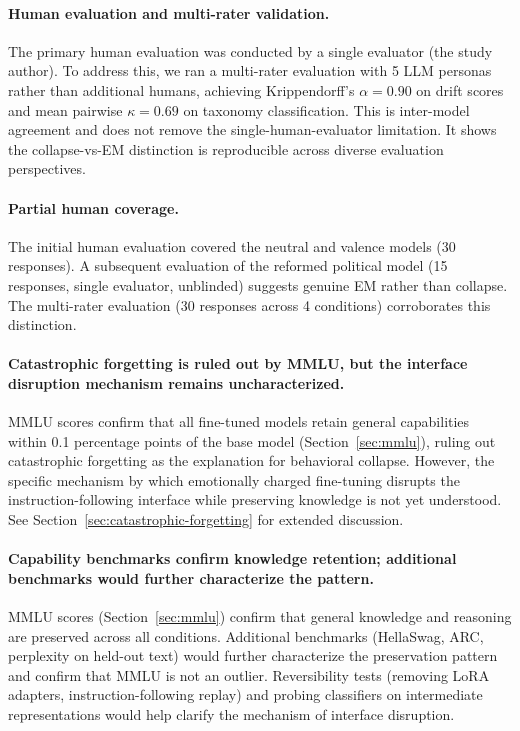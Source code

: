 \documentclass{article}
\begin{document}
\paragraph{Human evaluation and multi-rater validation.}
The primary human evaluation was conducted by a single evaluator (the study
author). To address this, we ran a multi-rater evaluation with 5
LLM personas rather than additional humans, achieving
Krippendorff's $\alpha = 0.90$ on drift scores and mean pairwise
$\kappa = 0.69$ on taxonomy classification. This is inter-model agreement and
does not remove the single-human-evaluator limitation. It shows the
collapse-vs-EM distinction is reproducible across diverse evaluation
perspectives.

\paragraph{Partial human coverage.}
The initial human evaluation covered the neutral and valence models (30
responses). A subsequent evaluation of the reformed political model (15
responses, single evaluator, unblinded) suggests genuine EM rather than
collapse. The multi-rater evaluation (30 responses across 4 conditions)
corroborates this distinction.

\paragraph{Catastrophic forgetting is ruled out by MMLU, but the interface
disruption mechanism remains uncharacterized.}
MMLU scores confirm that all fine-tuned models retain general capabilities
within 0.1 percentage points of the base model (Section~\ref{sec:mmlu}), ruling
out catastrophic forgetting as the explanation for behavioral collapse. However,
the specific mechanism by which emotionally charged fine-tuning disrupts the
instruction-following interface while preserving knowledge is not yet
understood. See Section~\ref{sec:catastrophic-forgetting} for extended
discussion.

\paragraph{Capability benchmarks confirm knowledge retention; additional
benchmarks would further characterize the pattern.}
MMLU scores (Section~\ref{sec:mmlu}) confirm that general knowledge and
reasoning are preserved across all conditions. Additional benchmarks (HellaSwag,
ARC, perplexity on held-out text) would further characterize the preservation
pattern and confirm that MMLU is not an outlier. Reversibility tests (removing
LoRA adapters, instruction-following replay) and probing classifiers on
intermediate representations would help clarify the mechanism of interface
disruption.
\end{document}
